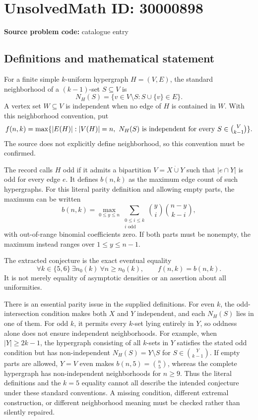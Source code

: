 \documentclass[11pt]{article}
\begin{document}
\section*{UnsolvedMath ID: 30000898}
\textbf{Source problem code:} catalogue entry
\subsection{Definitions and mathematical statement}
For a finite simple \(k\)-uniform hypergraph \(H=(V,E)\), the standard neighborhood of a \((k-1)\)-set \(S\subseteq V\) is
\[
 N_H(S)=\{v\in V\setminus S:S\cup\{v\}\in E\}.
\]
A vertex set \(W\subseteq V\) is independent when no edge of \(H\) is contained in \(W\). With this neighborhood convention, put
\[
 f(n,k)=\max\{|E(H)|:|V(H)|=n,\ N_H(S)\text{ is independent for every }S\in\tbinom V{k-1}\}.
\]
The source does not explicitly define neighborhood, so this convention must be confirmed.

The record calls \(H\) odd if it admits a bipartition \(V=X\mathbin{\dot\cup}Y\) such that \(|e\cap Y|\) is odd for every edge \(e\). It defines \(b(n,k)\) as the maximum edge count of such hypergraphs. For this literal parity definition and allowing empty parts, the maximum can be written
\[
 b(n,k)=\max_{0\leq y\leq n}
 \sum_{\substack{0\leq i\leq k\\i\text{ odd}}}
 \binom yi\binom{n-y}{k-i},
\]
with out-of-range binomial coefficients zero. If both parts must be nonempty, the maximum instead ranges over \(1\leq y\leq n-1\).

The extracted conjecture is the exact eventual equality
\[
 \forall k\in\{5,6\}\ \exists n_0(k)\ \forall n\geq n_0(k),\qquad
 f(n,k)=b(n,k).
\]
It is not merely equality of asymptotic densities or an assertion about all uniformities.

There is an essential parity issue in the supplied definitions. For even \(k\), the odd-intersection condition makes both \(X\) and \(Y\) independent, and each \(N_H(S)\) lies in one of them. For odd \(k\), it permits every \(k\)-set lying entirely in \(Y\), so oddness alone does not ensure independent neighborhoods. For example, when \(|Y|\geq2k-1\), the hypergraph consisting of all \(k\)-sets in \(Y\) satisfies the stated odd condition but has non-independent \(N_H(S)=Y\setminus S\) for \(S\in\binom Y{k-1}\). If empty parts are allowed, \(Y=V\) even makes \(b(n,5)=\binom n5\), whereas the complete hypergraph has non-independent neighborhoods for \(n\geq9\). Thus the literal definitions and the \(k=5\) equality cannot all describe the intended conjecture under these standard conventions. A missing condition, different extremal construction, or different neighborhood meaning must be checked rather than silently repaired.
\end{document}
